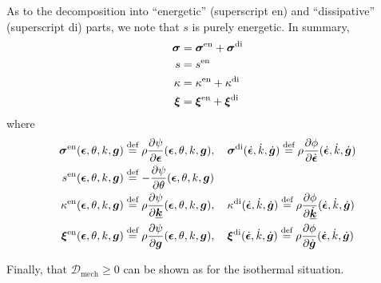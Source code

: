 As to the decomposition into ``energetic'' (superscript en) and ``dissipative'' 
(superscript di) parts, we note that $s$ is purely energetic. In summary,
\begin{subequations}\label{eq:8-419}
    \begin{align}
    \bm{\sigma} &= \bm{\sigma}^{\mathrm{en}}  + \bm{\sigma}^{\mathrm{di}} 
\label{eq:8-419a}\\
    s &= s^{\mathrm{en}} 
\label{eq:8-419b}\\
    \kappa &= \kappa^{\mathrm{en}}  + \kappa^{\mathrm{di}} 
\label{eq:8-419c}\\
    \bm{\xi} &= \bm{\xi}^{\mathrm{en}}  + \bm{\xi}^{\mathrm{di}} 
\label{eq:8-419c}
    \end{align}
\end{subequations}
where
\begin{subequations}\label{eq:8-219}
    \begin{align}
    \bm{\sigma}^{\mathrm{en}} (\bm{\epsilon},\theta,k,\bm {g}) &\stackrel{\text{def}}{=} \rho\frac{\partial \psi}{\partial \bm{\epsilon}}(\bm{\epsilon},\theta,k,\bm {g}), \quad
    \bm{\sigma}^{\mathrm{di}} (\dot{\bm{\epsilon}},\dot{k},\dot{\bm {g}}) \stackrel{\text{def}}{=} \rho\frac{\partial \phi}{\partial \dot{\bm{\epsilon}}}(\dot{\bm{\epsilon}},\dot{k},\dot{\bm {g}})
\label{eq:8-219a}\\
    s^{\mathrm{en}} (\bm{\epsilon},\theta,k,\bm {g}) &\stackrel{\text{def}}{=} -\frac{\partial \psi}{\partial \theta}(\bm{\epsilon},\theta,k,\bm {g})
\label{eq:8-219b}\\
    \kappa^{\mathrm{en}} (\bm{\epsilon},\theta,k,\bm {g}) &\stackrel{\text{def}}{=} \rho\frac{\partial \psi}{\partial \underline{\mbox{\boldmath $k$}}}(\bm{\epsilon},\theta,k,\bm {g}), \quad
    \kappa^{\mathrm{di}} (\dot{\bm{\epsilon}},\dot{k},\dot{\bm {g}}) \stackrel{\text{def}}{=} \rho\frac{\partial \phi}{\partial \dot{\underline{\mbox{\boldmath $k$}}}}(\dot{\bm{\epsilon}},\dot{k},\dot{\bm {g}})
\label{eq:8-219c}\\
    \bm{\xi}^{\mathrm{en}} (\bm{\epsilon},\theta,k,\bm {g}) &\stackrel{\text{def}}{=} \rho\frac{\partial \psi}{\partial \bm {g}}(\bm{\epsilon},\theta,k,\bm {g}), \quad
    \bm{\xi}^{\mathrm{di}} (\dot{\bm{\epsilon}},\dot{k},\dot{\bm {g}}) \stackrel{\text{def}}{=} \rho\frac{\partial \phi}{\partial \dot{\bm {g}}}(\dot{\bm{\epsilon}},\dot{k},\dot{\bm {g}})
\label{eq:8-219d}
    \end{align}
\end{subequations}

Finally, that ${\mathcal D}_{\mathrm{mech}}\geq 0$ can be shown as for the isothermal situation.




















